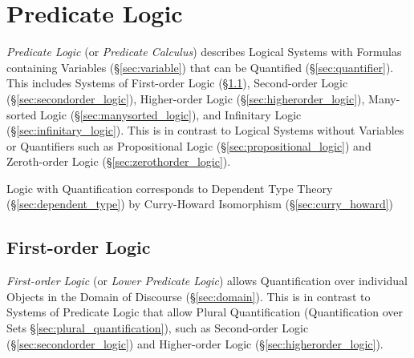 \section{Predicate Logic}\label{sec:predicate_logic}

\emph{Predicate Logic} (or \emph{Predicate Calculus}) describes
Logical Systems with Formulas containing Variables
(\S\ref{sec:variable}) that can be Quantified
(\S\ref{sec:quantifier}). This includes Systems of First-order Logic
(\S\ref{sec:firstorder_logic}), Second-order Logic
(\S\ref{sec:secondorder_logic}), Higher-order Logic
(\S\ref{sec:higherorder_logic}), Many-sorted Logic
(\S\ref{sec:manysorted_logic}), and Infinitary Logic
(\S\ref{sec:infinitary_logic}). This is in contrast to Logical Systems
without Variables or Quantifiers such as Propositional Logic
(\S\ref{sec:propositional_logic}) and Zeroth-order Logic
(\S\ref{sec:zerothorder_logic}).

Logic with Quantification corresponds to Dependent Type Theory
(\S\ref{sec:dependent_type}) by Curry-Howard Isomorphism
(\S\ref{sec:curry_howard})



\subsection{First-order Logic}\label{sec:firstorder_logic}

\emph{First-order Logic} (or \emph{Lower Predicate Logic}) allows
Quantification over individual Objects in the Domain of Discourse
(\S\ref{sec:domain}). This is in contrast to Systems of Predicate
Logic that allow Plural Quantification (Quantification over Sets
\S\ref{sec:plural_quantification}), such as Second-order Logic
(\S\ref{sec:secondorder_logic}) and Higher-order Logic
(\S\ref{sec:higherorder_logic}).

